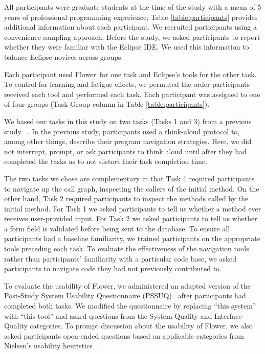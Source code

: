 \documentclass[conference]{IEEEtran}
\newcommand{\toolName}{Flower}
\begin{document}
All participants were graduate students at the time of the study with a mean of 5 years of professional programming experience; Table \ref{table:participants} provides additional information about each participant. We recruited participants using a convenience sampling approach. 
Before the study, we asked participants to report whether they were familiar with the Eclipse IDE. We used this information to balance Eclipse novices across groups.

Each participant used \toolName~for one task and Eclipse's tools for the other task.
To control for learning and fatigue effects, we permuted the order participants received each tool and performed each task. 
Each participant was assigned to one of four groups (Task Group column in Table \ref{table:participants}).

We based our tasks in this study on two tasks (Tasks 1 and 3) from a previous study ~\cite{Smith2015}.
In the previous study, participants used a think-aloud protocol to, among other things, describe their program navigation strategies.
Here, we did not interrupt, prompt, or ask participants to think aloud until after they had completed the tasks as to not distort their task completion time.

The two tasks we chose are complementary in that Task 1 required participants to navigate up the call graph, inspecting the callers of the initial method. 
On the other hand, Task 2 required participants to inspect the methods called by the initial method.
For Task 1 we asked participants to tell us whether a method ever receives user-provided input.
For Task 2 we asked participants to tell us whether a form field is validated before being sent to the database.
To ensure all participants had a baseline familiarity, we trained participants on the appropriate tools preceding each task. 
To evaluate the effectiveness of the navigation tools rather than participants' familiarity with a particular code base, we asked participants to navigate code they had not previously contributed to. 


To evaluate the usability of \toolName, we administered an adapted version of the Post-Study System Usability Questionnaire (PSSUQ)~\cite{Lewis95ibmcomputer} after participants had completed both tasks. We modified the questionnaire by replacing ``this system'' with ``this tool'' and asked questions from the System Quality and Interface Quality categories.
To prompt discussion about the usability of \toolName, we also asked participants open-ended questions based on applicable categories from Nielsen's usability heuristics~\cite{Nielsen1992}.
\end{document}
